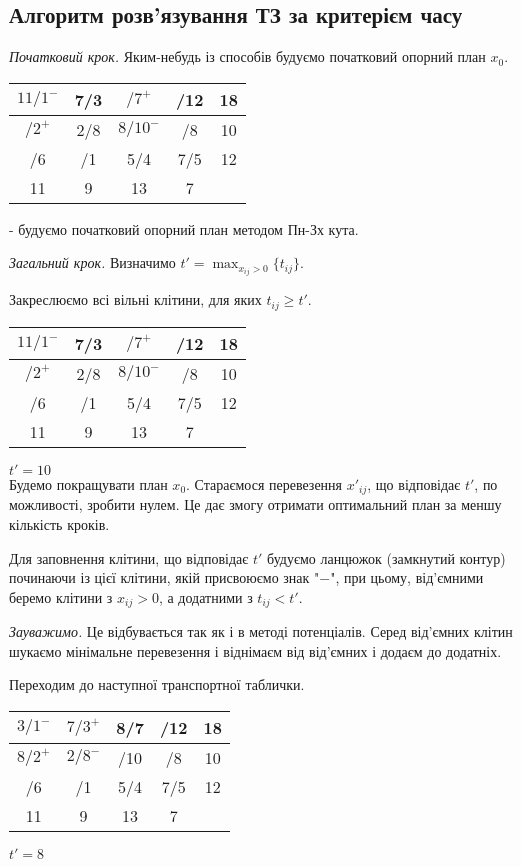 \documentclass[12pt,a4paper]{book}
\newenvironment{slim_enumerate}{
\begin{enumerate}
  \setlength{\itemsep}{1pt}
  \setlength{\parskip}{0pt}
  \setlength{\parsep}{0pt}}
{\end{enumerate}}
\begin{document}
\subsection{Алгоритм розв’язування ТЗ за критерієм часу}
\begin{slim_enumerate}
  \item {\it Початковий крок.} Яким-небудь із способів будуємо початковий опорний план $x_0$.\\
\begin{tabular}{ | c | c | c | c | c | }
\hline
$11/1^-$	&	7/3	&	$/7^+$	&\cellcolor[rgb]{0.8,0.8,0.8}	/12	&	18\\
\hline
$/2^+$	&	2/8	&	$8/10^-$	&	/8	&	10\\
\hline
/6	&	/1	&	5/4	&	7/5	&	12\\
\hline
11	&	9	&	13	&	7	&\\
\hline
\end{tabular}
- будуємо початковий опорний план методом Пн-Зх кута.

  \item {\it Загальний крок.} Визначимо $t'=\displaystyle\max_{x_{ij}>0}\{t_{ij}\}$.

Закреслюємо всі вільні клітини, для яких $t_{ij} \geq t'$.

\begin{tabular}{ | c | c | c | c | c | }
\hline
$11/1^-$	&	7/3	&	$/7^+$	&\cellcolor[rgb]{0.8,0.8,0.8}	/12	&	18\\
\hline
$/2^+$	&	2/8	&	$8/10^-$	&	/8	&	10\\
\hline
/6	&	/1	&	5/4	&	7/5	&	12\\
\hline
11	&	9	&	13	&	7	&\\
\hline
\end{tabular}
$t'=10$\\

Будемо покращувати план $x_0$. Стараємося перевезення $x'_{ij}$, що відповідає $t'$, по можливості, зробити нулем. Це дає змогу отримати оптимальний план за меншу кількість кроків.

Для заповнення клітини, що відповідає $t'$ будуємо ланцюжок (замкнутий контур) починаючи із цієї клітини, якій присвоюємо знак "$-$", при цьому, від’ємними беремо клітини з $x_{ij}>0$, а додатними з $t_{ij}<t'$.

{\it Зауважимо.} Це відбувається так як і в методі потенціалів. Серед від’ємних клітин шукаємо мінімальне перевезення і віднімаєм від від’ємних і додаєм до додатніх.

Переходим до наступної транспортної таблички.\\
\begin{tabular}{ | c | c | c | c | c | }
\hline
$3/1^-$	&	$7/3^+$	&	8/7	&\cellcolor[rgb]{0.8,0.8,0.8}	/12	&	18\\
\hline
$8/2^+$	&	$2/8^-$	&\cellcolor[rgb]{0.8,0.8,0.8}	/10	&\cellcolor[rgb]{0.8,0.8,0.8}	/8	&	10\\
\hline
/6	&	/1	&	5/4	&	7/5	&	12\\
\hline
11	&	9	&	13	&	7	&\\
\hline
\end{tabular}
$t'=8$\\


\end{slim_enumerate}
\end{document}
